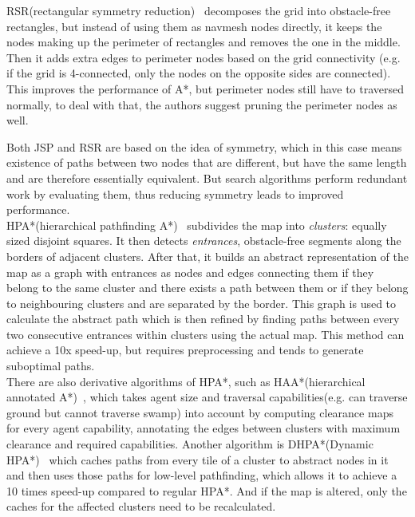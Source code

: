 \documentclass{article}
\begin{document}
RSR(rectangular symmetry reduction)~\cite{harabor2011path} decomposes the grid into obstacle-free rectangles, but instead of using them as navmesh nodes directly, it keeps the nodes making up the perimeter of rectangles and removes the one in the middle. Then it adds extra edges to perimeter nodes based on the grid connectivity (e.g. if the grid is 4-connected, only the nodes on the opposite sides are connected). This improves the performance of A*, but perimeter nodes still have to traversed normally, to deal with that, the authors suggest pruning the perimeter nodes as well.

Both JSP and RSR are based on the idea of symmetry, which in this case means existence of paths between two nodes that are different, but have the same length and are therefore essentially equivalent. But search algorithms perform redundant work by evaluating them, thus reducing symmetry leads to improved performance. \\

HPA*(hierarchical pathfinding A*)~\cite{botea2004near} subdivides the map  into \emph{clusters}: equally sized disjoint squares. It then detects \emph{entrances}, obstacle-free segments along the borders of adjacent clusters. After that, it builds an abstract representation of the map as a graph with entrances as nodes and edges connecting them if they belong to the same cluster and there exists a path between them or if they belong to neighbouring clusters and are separated by the border. This graph is used to calculate the abstract path which is then refined by finding paths between every two consecutive entrances within clusters using the actual map. This method can achieve a 10x speed-up, but requires preprocessing and tends to generate suboptimal paths. \\

There are also derivative algorithms of HPA*, such as HAA*(hierarchical annotated A*)~\cite{harabor2008hierarchical}, which takes agent size and traversal capabilities(e.g. can traverse ground but cannot traverse swamp) into account by computing clearance maps for every agent capability, annotating the edges between clusters with maximum clearance and required capabilities. Another algorithm is DHPA*(Dynamic HPA*)~\cite{kring2010dhpa} which caches paths from every tile of a cluster to abstract nodes in it and then uses those paths for low-level pathfinding, which allows it to achieve a 10 times speed-up compared to regular HPA*. And if the map is altered, only the caches for the affected clusters need to be recalculated. \\
\end{document}
